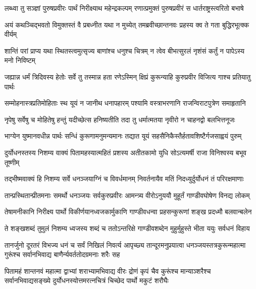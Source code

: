 \twolineshloka
{लब्ध्वा तु सञ्ज्ञां पुरुषप्रवीरः पार्थं निरीक्ष्याथ महेन्द्रकल्पम्}
{रणात्प्रमुक्तं पुरुषप्रवीरं स धार्तराष्ट्रस्त्वरितो बभाषे}


\twolineshloka
{अयं कथञ्चिद्भवतो विमुक्तस्तं वै प्रबध्नीत यथा न मुच्येत्}
{तमब्रवीच्छान्तनवः प्रहस्य क्व ते गता बुद्धिरभूत्क्क वीर्यम्}


\twolineshloka
{शान्तिं परां प्राप्य यथा स्थितस्त्वमुत्सृज्य बाणांश्च धनुश्च चित्रम्}
{न त्वेव बीभत्सुरलं नृशंसं कर्तुं न पापेऽस्य मनो निविष्टम्}


\twolineshloka
{जह्यान्न धर्मं त्रिदिवस्य हेतोः सर्वे तु तस्मान्न हता रणेऽस्मिन्}
{क्षिप्रं कुरून्याहि कुरुप्रवीर विजित्य गाश्च प्रतियातु पार्थः}


\twolineshloka
{सम्मोहनास्त्रप्रतिमोहिताः स्थ यूयं न जानीथ धनापहारम्}
{पश्यामि वस्त्राभरणानि राजन्विराटपुत्रेण समाहृतानि}


\twolineshloka
{नृपेषु सर्वेषु च मोहितेषु हन्तुं यदीच्छेत्स हनिष्यतीति}
{तदा तु धर्मात्मतया नृवीरो न चाहनद्वो बलभित्तनूजः}


\twolineshloka
{भाग्येन युष्मानवधीन्न पार्थः सन्धिं कुरूणामनुमन्यमानः}
{तद्यात यूयं सहसैनिकैस्तैर्हतावशिष्टैर्गजसाह्वयं पुरुम्}



\twolineshloka
{दुर्योधनस्तस्य निशम्य वाक्यं पितामहस्यात्महितं प्रशस्य}
{अतीतकामो युधि सोऽत्यमर्षी राजा विनिश्वस्य बभूव तूष्णीम्}


\twolineshloka
{तद्भीष्मवाक्यं हि निशम्य सर्वे धनञ्जयाग्निं च विवर्धमानम्}
{निवर्तनायैव मतिं निदध्युर्दुर्योधनं तं परिरक्षमाणाः}


\twolineshloka
{तान्प्रस्थितान्प्रीतमनाः समर्थो धनञ्जयः सर्वकुरुप्रवीरः}
{आमन्त्र्य वीरोऽनुययौ मुहूर्तं गाण्डीवघोषेण विनद्य लोकम्}


\twolineshloka
{तेषामनीकानि निरीक्ष्य पार्थो विकीर्णयानध्वजकार्मुकाणि}
{गाण्डीवधन्वा प्रहसन्कुरूणां शङ्ख प्रदध्मौ बलवान्बलेन}


\twolineshloka
{ते शङ्खशब्दं तुमुलं निशम्य ध्वजस्य शब्दं च ततोऽन्तरिक्षे}
{गाण्डीवशब्देन मुहुर्मुहुस्ते भीता ययुः सर्वधनं विहाय}


\threelineshloka
{तानर्जुनो दूरतरं विभज्य धनं च सर्वं निखिलं निवर्त्य}
{आपृच्छ्य तान्दूरमनुप्रयात्वा धनञ्जयस्तत्रकुरून्महात्मा}
{गुरूंश्च सर्वानभिवाद्य बाणैर्न्यवर्ततोदग्रमनाः शरैः सह}


\threelineshloka
{पितामहं शान्तनवं महात्मा द्वाभ्यां शराभ्यामभिवाद्य वीरः}
{द्रोणं कृपं चैव कुरूंश्च मान्याञ्शरैश्च सर्वानभिवाद्यसङ्ख्ये}
{दुर्योधनस्योत्तमरत्नचित्रं चिच्छेद पार्थो मकुटं शरौघैः}


